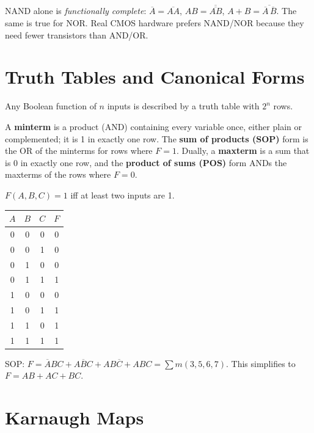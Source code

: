 \begin{important}[Universality]
NAND alone is \emph{functionally complete}: $\overline{A} = \overline{AA}$,
$AB = \overline{\overline{AB}}$, $A+B = \overline{\overline{A}\,\overline{B}}$.
The same is true for NOR. Real CMOS hardware prefers NAND/NOR because they
need fewer transistors than AND/OR.
\end{important}

\section{Truth Tables and Canonical Forms}

Any Boolean function of $n$ inputs is described by a truth table with $2^n$
rows.

\begin{definition}
A \textbf{minterm} is a product (AND) containing every variable once, either
plain or complemented; it is 1 in exactly one row. The \textbf{sum of
products (SOP)} form is the OR of the minterms for rows where $F = 1$.
Dually, a \textbf{maxterm} is a sum that is 0 in exactly one row, and the
\textbf{product of sums (POS)} form ANDs the maxterms of the rows where
$F = 0$.
\end{definition}

\begin{example}
$F(A,B,C) = 1$ iff at least two inputs are 1.
\begin{center}
\begin{tabular}{ccc|c}
\toprule
$A$ & $B$ & $C$ & $F$ \\
\midrule
0&0&0&0\\ 0&0&1&0\\ 0&1&0&0\\ 0&1&1&1\\
1&0&0&0\\ 1&0&1&1\\ 1&1&0&1\\ 1&1&1&1\\
\bottomrule
\end{tabular}
\end{center}
SOP: $F = \overline{A}BC + A\overline{B}C + AB\overline{C} + ABC
= \sum m(3,5,6,7)$. This simplifies to $F = AB + AC + BC$.
\end{example}

\section{Karnaugh Maps}

